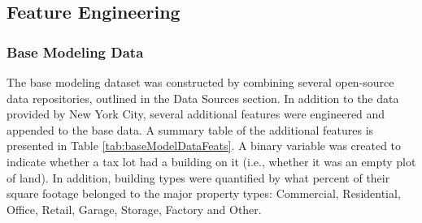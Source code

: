 \documentclass[12pt,]{article}
\begin{document}
\hypertarget{feature-engineering}{%
\subsection{Feature Engineering}\label{feature-engineering}}

\hypertarget{base-modeling-data}{%
\subsubsection{Base Modeling Data}\label{base-modeling-data}}

The base modeling dataset was constructed by combining several
open-source data repositories, outlined in the Data Sources section. In
addition to the data provided by New York City, several additional
features were engineered and appended to the base data. A summary table
of the additional features is presented in Table
\ref{tab:baseModelDataFeats}. A binary variable was created to indicate
whether a tax lot had a building on it (i.e., whether it was an empty
plot of land). In addition, building types were quantified by what
percent of their square footage belonged to the major property types:
Commercial, Residential, Office, Retail, Garage, Storage, Factory and
Other.
\end{document}
